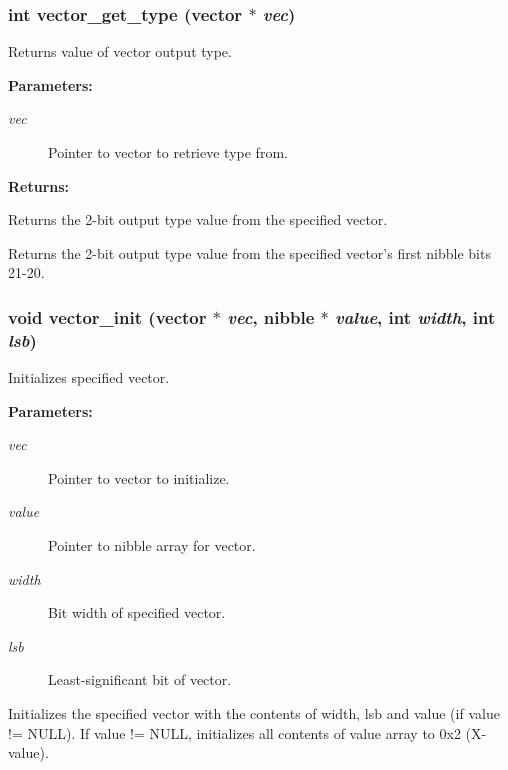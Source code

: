 \subsubsection{\setlength{\rightskip}{0pt plus 5cm}int vector\_\-get\_\-type ({\bf vector} $\ast$ {\em vec})}\label{vector_8h_a14}


Returns value of vector output type.

\begin{Desc}
\item[{\bf Parameters: }]\par
\begin{description}
\item[
{\em vec}]Pointer to vector to retrieve type from.

\end{description}
\end{Desc}
\begin{Desc}
\item[{\bf Returns: }]\par
Returns the 2-bit output type value from the specified vector.

\end{Desc}
Returns the 2-bit output type value from the specified vector's first nibble bits 21-20. 
\subsubsection{\setlength{\rightskip}{0pt plus 5cm}void vector\_\-init ({\bf vector} $\ast$ {\em vec}, {\bf nibble} $\ast$ {\em value}, int {\em width}, int {\em lsb})}\label{vector_8h_a0}


Initializes specified vector.

\begin{Desc}
\item[{\bf Parameters: }]\par
\begin{description}
\item[
{\em vec}]Pointer to vector to initialize. \item[
{\em value}]Pointer to nibble array for vector. \item[
{\em width}]Bit width of specified vector. \item[
{\em lsb}]Least-significant bit of vector.

\end{description}
\end{Desc}
Initializes the specified vector with the contents of width, lsb and value (if value != NULL). If value != NULL, initializes all contents  of value array to 0x2 (X-value). 
